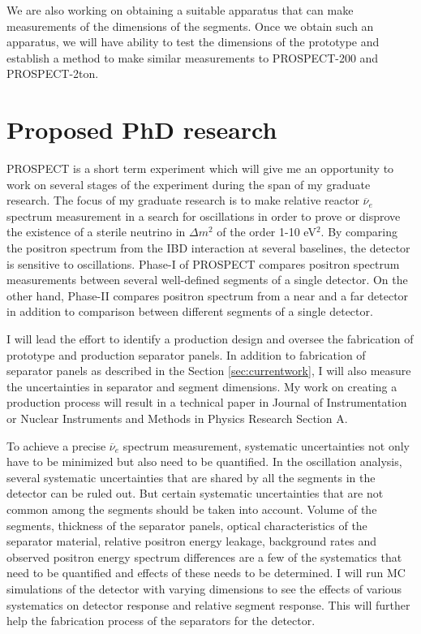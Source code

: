 \documentclass[11pt]{article}
\newcommand{\nuebar}{\ensuremath{\overline{\nu }_{e}} \hspace{1pt}}
\numberwithin{equation}{section}
\begin{document}
We are also working on obtaining a suitable apparatus that can make measurements of the dimensions of the segments. Once we obtain such an apparatus, we will have ability to test the dimensions of the prototype and establish a method to make similar measurements to PROSPECT-200 and PROSPECT-2ton. 

\section[Proposed PhD research]{Proposed PhD research}
\label{sec:proposedPHD}
PROSPECT is a short term experiment which will give me an opportunity to work on several stages of the experiment during the span of my graduate research. The focus of my graduate research is to make relative reactor $\nuebar$ spectrum measurement in a search for oscillations in order to prove or disprove the existence of a sterile neutrino in $\Delta m^{2}$ of the order 1-10 eV${^2}$. By comparing the positron spectrum from the IBD interaction at several baselines, the detector is sensitive to oscillations. Phase-I of PROSPECT compares positron spectrum measurements between several well-defined segments of a single detector. On the other hand, Phase-II compares positron spectrum from a near and a far detector in addition to comparison between different segments of a single detector. 

I will lead the effort to identify a production design and oversee the fabrication of prototype and production separator panels. In addition to fabrication of separator panels as described in the Section \ref{sec:currentwork}, I will also measure the uncertainties in separator and segment dimensions. My work on creating a production process will result in a technical paper in Journal of Instrumentation or Nuclear Instruments and Methods in Physics Research Section A.

To achieve a precise \nuebar spectrum measurement, systematic uncertainties not only have to be minimized but also need to be quantified. In the oscillation analysis, several systematic uncertainties that are shared by all the segments in the detector can be ruled out. But certain systematic uncertainties that are not common among the segments should be taken into account. Volume of the segments, thickness of the separator panels, optical characteristics of the separator material, relative positron energy leakage, background rates and observed positron energy spectrum differences are a few of the systematics that need to be quantified and effects of these needs to be determined. I will run MC simulations of the detector with varying dimensions to see the effects of various systematics on detector response and relative segment response.
This will further help the fabrication process of the separators for the detector. 
\end{document}
